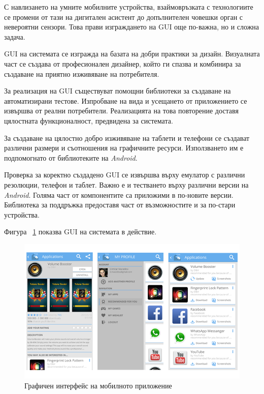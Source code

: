 		С навлизането на умните мобилните устройства, взаймовръзката с технологиите се промени от тази на дигитален асистент до допълнителен човешки орган с невероятни сензори.\cite{Nudelman} Това прави изграждането на \ac{GUI} още по-важна, но и сложна задача.
		
		\ac{GUI} на системата се изгражда на базата на добри практики за дизайн. Визуалната част се създава от професионален дизайнер, който ги спазва и комбинира за създаване на приятно изживяване на потребителя.
		
		За реализация на \ac{GUI} съществуват помощни библиотеки за създаване на автоматизирани тестове. Изпробване на вида и усещането от приложението се извършва от реални потребители. Реализацията на това повторение доставя цялостната функционалност, предвидена за системата.
		
		За създаване на цялостно добро изживяване на таблети и телефони се създават различни размери и съотношения на графичните ресурси. Използването им е подпомогнато от библиотеките на \emph{Android}.
		
		Проверка за коректно създадено \ac{GUI} се извършва върху емулатор с различни резолюции, телефон и таблет. Важно е и тестването върху различни версии на \emph{Android}. Голяма част от компонентите са приложими в по-новите версии. Библиотека за поддръжка предоставя част от възможностите и за по-стари устройства.
		
		Фигура ~\ref{figure:tsunapper-gui} показва \ac{GUI} на системата в действие.		
		
		\begin{figure}[htbp]
			\centering
 			\includegraphics[scale=0.6]{assets/tsunapper-gui.png}
			\caption{Графичен интерфейс на мобилното приложение}
			\label{figure:tsunapper-gui}
		\end{figure}
